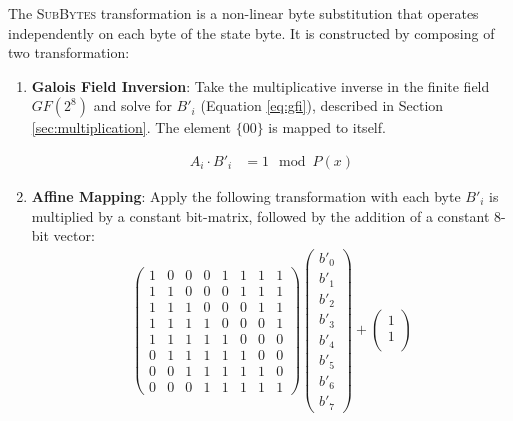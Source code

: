 The \textsc{SubBytes} transformation is a non-linear byte substitution that operates independently on each byte of the state byte.
It is constructed by composing of two transformation:
\begin{enumerate}
    \item \textbf{Galois Field Inversion}: 
    Take the multiplicative inverse in the finite field $GF(2^8)$ and solve for ${B'}_i$ (Equation \ref{eq:gfi}), described in Section \ref{sec:multiplication}. 
    The element $\{00\}$ is mapped to itself.
    
    \begin{align}
        A_i \cdot {B'}_i &= 1 \mod P(x)
        \label{eq:gfi}
    \end{align}

    \item \textbf{Affine Mapping}:
    Apply the following transformation with
    each byte ${B'}_i$ is multiplied by a constant bit-matrix, followed by the addition of a constant 8-bit vector:
    \begin{align}
        \begin{pmatrix}
            1 & 0 & 0 & 0 & 1 & 1 & 1 & 1\\
            1 & 1 & 0 & 0 & 0 & 1 & 1 & 1\\
            1 & 1 & 1 & 0 & 0 & 0 & 1 & 1\\
            1 & 1 & 1 & 1 & 0 & 0 & 0 & 1\\
            1 & 1 & 1 & 1 & 1 & 0 & 0 & 0\\
            0 & 1 & 1 & 1 & 1 & 1 & 0 & 0\\
            0 & 0 & 1 & 1 & 1 & 1 & 1 & 0\\
            0 & 0 & 0 & 1 & 1 & 1 & 1 & 1
        \end{pmatrix}
        \begin{pmatrix}
            {b'}_0\\
            {b'}_1\\
            {b'}_2\\
            {b'}_3\\
            {b'}_4\\
            {b'}_5\\
            {b'}_6\\
            {b'}_7
        \end{pmatrix}
        +
        \begin{pmatrix}
            1\\
            1\\

\end{pmatrix}
\end{align}
\end{enumerate}
